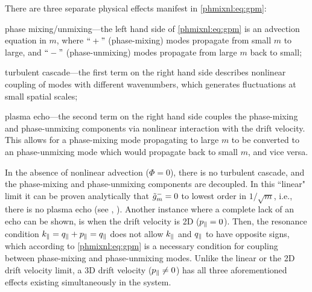 %
%
There are three separate physical effects manifest in \eqref{phmixnl:eq:gpm}: 
\begin{inparaenum}[(i)]
\item phase mixing/unmixing---the left hand side of \eqref{phmixnl:eq:gpm} is an advection equation in $m$, where
$``+"$ (phase-mixing) modes propagate from small $m$ to large,
and $``-"$ (phase-unmixing) modes propagate from large $m$ back to small; 
\item turbulent cascade---the first term on the right hand side describes nonlinear
coupling of modes with different wavenumbers, which generates fluctuations at small spatial scales;
\item plasma echo---the second term on the right hand side couples the phase-mixing and
phase-unmixing components via nonlinear interaction with the drift velocity. This allows
for a phase-mixing mode propagating to large $m$ to be converted to an phase-unmixing
mode which would propagate back to small $m$, and vice versa.
\end{inparaenum}

In the absence of nonlinear advection ($\Phi = 0$), there is no turbulent cascade, and the
phase-mixing and phase-unmixing
components are decoupled. In this ``linear" limit it can be proven analytically that $\tilde g_m^- = 0$ to lowest
order in $1/\sqrt{m}$, i.e., there is no plasma echo (see \cite{kanekar14a},
). Another instance where a
complete lack of an echo can be shown, is when the drift velocity is 2D
($p_\parallel=0$). Then, the resonance condition $k_\parallel = q_\parallel + p_\parallel = q_\parallel$ does not allow
$k_\parallel$ and $q_\parallel$ to have opposite signs, which according to \eqref{phmixnl:eq:gpm} is a necessary
condition for coupling between phase-mixing and phase-unmixing modes.
Unlike the linear or the 2D drift velocity limit,
a 3D drift velocity ($p_\parallel\neq0$) has all three aforementioned effects existing
simultaneously in the system.

